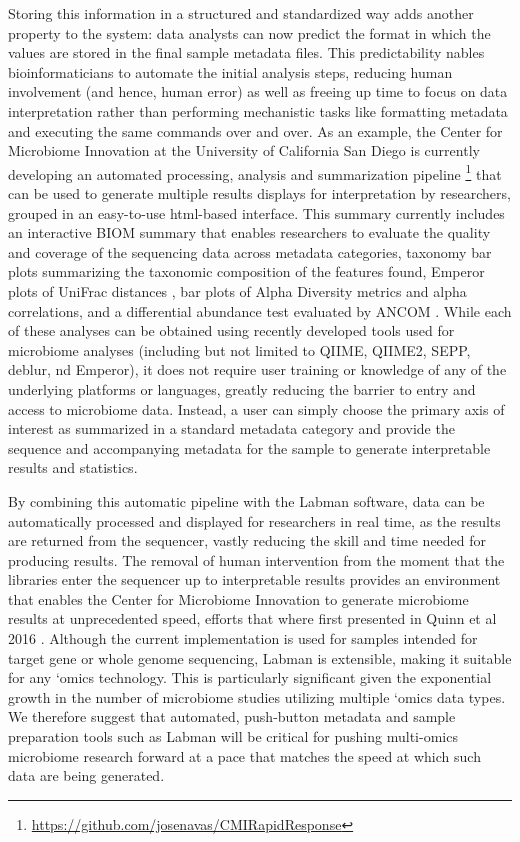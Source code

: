 Storing this information in a structured and standardized way adds another
property to the system: data analysts can now predict the format in which the
values are stored in the final sample metadata files. This predictability
nables bioinformaticians to automate the initial analysis steps, reducing human
involvement (and hence, human error) as well as freeing up time to focus on data
interpretation rather than performing mechanistic tasks like formatting metadata
and executing the same commands over and over. As an example, the Center for
Microbiome Innovation at the University of California San Diego is currently
developing an automated processing, analysis and summarization
pipeline \footnote{\url{https://github.com/josenavas/CMIRapidResponse}} that can
be used to generate multiple results displays for interpretation by researchers,
grouped in an easy-to-use html-based interface. This summary currently includes
an interactive BIOM \cite{McDonald2012BIOM} summary that enables researchers to evaluate the quality
and coverage of the sequencing data across metadata categories, taxonomy bar
plots summarizing the taxonomic composition of the features found, Emperor \cite{Vazquez-Baeza2013}
plots of UniFrac distances \cite{Lozupone2005}, bar plots of Alpha Diversity metrics and alpha
correlations, and a differential abundance test evaluated by ANCOM \cite{Mandal2015}. While
each of these analyses can be obtained using recently developed tools used for
microbiome analyses (including but not limited to QIIME, QIIME2, SEPP, deblur,
nd Emperor), it does not require user training or knowledge of any of the
underlying platforms or languages, greatly reducing the barrier to entry and
access to microbiome data. Instead, a user can simply choose the primary axis of
interest as summarized in a standard metadata category and provide the sequence
and accompanying metadata for the sample to generate interpretable results and
statistics.

By combining this automatic pipeline with the Labman software, data can be
automatically processed and displayed for researchers in real time, as the
results are returned from the sequencer, vastly reducing the skill and time
needed for producing results. The removal of human intervention from the moment
that the libraries enter the sequencer up to interpretable results provides an
environment that enables the Center for Microbiome Innovation to generate
microbiome results at unprecedented speed, efforts that where first presented in
Quinn et al 2016 \cite{Quinn2016}. Although the current implementation is used for samples
intended for target gene or whole genome sequencing, Labman is extensible,
making it suitable for any ‘omics technology. This is particularly significant
given the exponential growth in the number of microbiome studies utilizing
multiple ‘omics data types. We therefore suggest that automated, push-button
metadata and sample preparation tools such as Labman will be critical for
pushing multi-omics microbiome research forward at a pace that matches the
speed at which such data are being generated.

